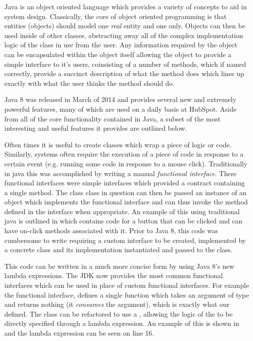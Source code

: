 Java is an object oriented language which provides a variety of concepts to aid in system design. Classically, the core of object oriented programming is that entities (objects) should model one \textit{real} entity and one only. Objects can then be used inside of other classes, abstracting away all of the complex implementation logic of the class in use from the user. Any information required by the object can be encapsulated within the object itself allowing the object to provide a simple interface to it's users, coinsisting of a number of methods, which if named correctly, provide a succinct description of what the method does which lines up exactly with what the user thinks the method should do.

Java 8 was released in March of 2014 and provides several new and extremely powerful features, many of which are used on a daily basis at HubSpot. Aside from all of the core functionality contained in Java, a subset of the most interesting and useful features it provides are outlined below.


Often times it is useful to create classes which wrap a piece of logic or code. Similarly, systems often require the execution of a piece of code in response to a certain event (e.g. running some code in response to a mouse click). Traditionally in java this was accomplished by writing a manual \textit{functional interface}. There functional interfaces were simple interfaces which provided a contract containing a single method. The class class in question can then be passed an instance of an object which implements the functional interface and can thus invoke the method defined in the interface when appropriate. An example of this using traditional java is outlined in  which contains code for a button that can be clicked and can have on-click methods associated with it. Prior to Java 8, this code was cumbersome to write requiring a custom interface to be created, implemented by a concrete class and its implementation instantiated and passed to the class. 



This code can be written in a much more concise form by using Java 8's new lambda expressions. The JDK now provides the most common functional interfaces which can be used in place of custom functional interfaces. For example the  functional interface, defines a single  function which takes an argument of type  and returns nothing (it \textit{consumes} the argument), which is exactly what our  defined. The  class can be refactored to use a , allowing the logic of the  to be directly specified through a lambda expression. An example of this is shown in  and the lambda expression can be seen on line 16.

